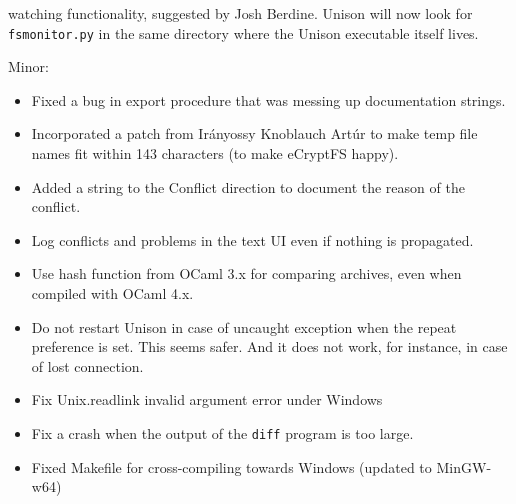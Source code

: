 \begin{changesfromversion}{2.45}
\begin{itemize}
  watching functionality, suggested by Josh Berdine.  Unison will now
  look for {\tt fsmonitor.py} in the same directory where the Unison
  executable itself lives.
\end{itemize}
\item Minor:
\begin{itemize}
\item Fixed a bug in export procedure that was messing up documentation
strings.
\item Incorporated a patch from Ir\'anyossy Knoblauch Art\'ur to make temp file
  names fit within 143 characters (to make eCryptFS happy).
\item Added a string to the Conflict direction to document the reason of
  the conflict.
\item Log conflicts and problems in the text UI even if nothing is propagated.
\item Use hash function from OCaml 3.x for comparing archives, even when
  compiled with OCaml 4.x.
\item Do not restart Unison in case of uncaught exception when the repeat
  preference is set.  This seems safer.  And it does not work, for
  instance, in case of lost connection.
\item Fix Unix.readlink invalid argument error under Windows
\item Fix a crash when the output of the {\tt diff} program is too large.
\item Fixed Makefile for cross-compiling towards Windows (updated to MinGW-w64)
\end{itemize}
\end{changesfromversion}

